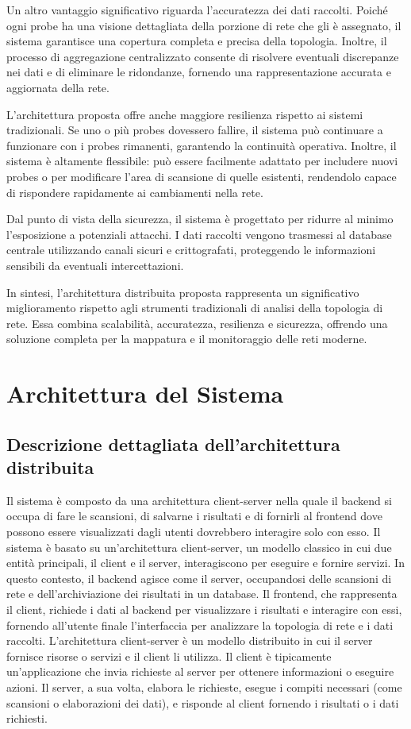 \documentclass[target=bach,aauheader=,style=]{thud}
\begin{document}
Un altro vantaggio significativo riguarda l'accuratezza dei dati raccolti. Poiché ogni probe ha una visione dettagliata della porzione di rete che gli è assegnato, il sistema garantisce una copertura completa e precisa della topologia. Inoltre, il processo di aggregazione centralizzato consente di risolvere eventuali discrepanze nei dati e di eliminare le ridondanze, fornendo una rappresentazione accurata e aggiornata della rete.

L'architettura proposta offre anche maggiore resilienza rispetto ai sistemi tradizionali. Se uno o più probes dovessero fallire, il sistema può continuare a funzionare con i probes rimanenti, garantendo la continuità operativa. Inoltre, il sistema è altamente flessibile: può essere facilmente adattato per includere nuovi probes o per modificare l'area di scansione di quelle esistenti, rendendolo capace di rispondere rapidamente ai cambiamenti nella rete.

Dal punto di vista della sicurezza, il sistema è progettato per ridurre al minimo l'esposizione a potenziali attacchi. I dati raccolti vengono trasmessi al database centrale utilizzando canali sicuri e crittografati, proteggendo le informazioni sensibili da eventuali intercettazioni.

In sintesi, l'architettura distribuita proposta rappresenta un significativo miglioramento rispetto agli strumenti tradizionali di analisi della topologia di rete. Essa combina scalabilità, accuratezza, resilienza e sicurezza, offrendo una soluzione completa per la mappatura e il monitoraggio delle reti moderne.

\newpage
\section{Architettura del Sistema}
\subsection{Descrizione dettagliata dell'architettura distribuita}
Il sistema è composto da una architettura client-server \cite{orfali1999client} nella quale il backend si occupa di fare le scansioni, di salvarne i risultati e di fornirli al frontend dove possono essere visualizzati dagli utenti dovrebbero interagire solo con esso. 
Il sistema è basato su un'architettura client-server, un modello classico in cui due entità principali, il client e il server, interagiscono per eseguire e fornire servizi. In questo contesto, il backend agisce come il server, occupandosi delle scansioni di rete e dell'archiviazione dei risultati in un database. Il frontend, che rappresenta il client, richiede i dati al backend per visualizzare i risultati e interagire con essi, fornendo all'utente finale l'interfaccia per analizzare la topologia di rete e i dati raccolti.
L'architettura client-server è un modello distribuito in cui il server fornisce risorse o servizi e il client li utilizza. Il client è tipicamente un'applicazione che invia richieste al server per ottenere informazioni o eseguire azioni. Il server, a sua volta, elabora le richieste, esegue i compiti necessari (come scansioni o elaborazioni dei dati), e risponde al client fornendo i risultati o i dati richiesti.
\end{document}
